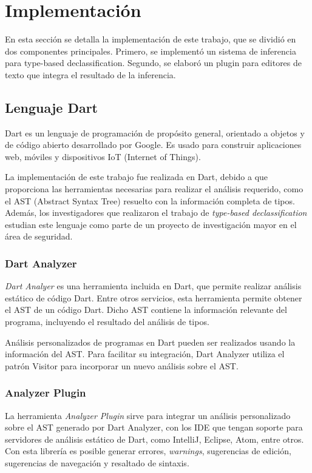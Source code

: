 \chapter{Implementación}
En esta sección se detalla la implementación de este trabajo, que se dividió en dos componentes principales. Primero, se implementó un sistema de inferencia para type-based declassification. Segundo, se elaboró un plugin para editores de texto que integra el resultado de la inferencia.

\section{Lenguaje Dart}
Dart es un lenguaje de programación de propósito general, orientado a objetos y de código abierto desarrollado por Google. Es usado para construir aplicaciones web, móviles y dispositivos IoT (Internet of Things).

La implementación de este trabajo fue realizada en Dart, debido a que proporciona las herramientas necesarias para realizar el análisis requerido, como el AST (Abstract Syntax Tree) resuelto con la información completa de tipos. Además, los investigadores que realizaron el trabajo de \textit{type-based declassification} estudian este lenguaje como parte de un proyecto de investigación mayor en el área de seguridad.

\subsection{Dart Analyzer}
\emph{Dart Analyer} es una herramienta incluida en Dart, que permite realizar análisis estático de código Dart. Entre otros servicios, esta herramienta permite obtener el AST de un código Dart. Dicho AST contiene la información relevante del programa, incluyendo el resultado del análisis de tipos.

Análisis personalizados de programas en Dart pueden ser realizados usando la información del AST. Para facilitar su integración, Dart Analyzer utiliza el patrón Visitor para incorporar un nuevo análisis sobre el AST.

\subsection{Analyzer Plugin}
La herramienta \emph{Analyzer Plugin} sirve para integrar un análisis personalizado sobre el AST generado por Dart Analyzer, con los IDE que tengan soporte para servidores de análisis estático de Dart, como IntelliJ, Eclipse, Atom, entre otros. Con esta librería es posible generar errores, \textit{warnings}, sugerencias de edición, sugerencias de navegación  y resaltado de sintaxis.

